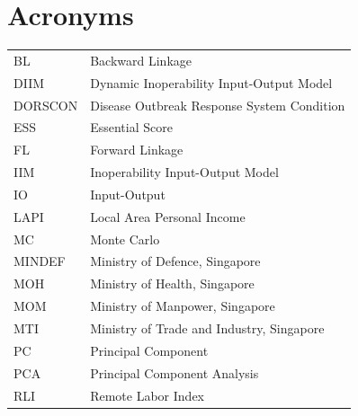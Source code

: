 
\chapter*{Acronyms}

\begin{tabular}{@{}ll@{}}
BL      & Backward Linkage \\
DIIM    & Dynamic Inoperability Input-Output Model \\
DORSCON & Disease Outbreak Response System Condition \\
ESS     & Essential Score \\
FL      & Forward Linkage \\
IIM     & Inoperability Input-Output Model \\
IO      & Input-Output \\
LAPI    & Local Area Personal Income \\
MC      & Monte Carlo \\
MINDEF  & Ministry of Defence, Singapore \\
MOH     & Ministry of Health, Singapore \\
MOM     & Ministry of Manpower, Singapore \\
MTI     & Ministry of Trade and Industry, Singapore \\
PC      & Principal Component \\
PCA     & Principal Component Analysis \\
RLI     & Remote Labor Index \\
\end{tabular}

